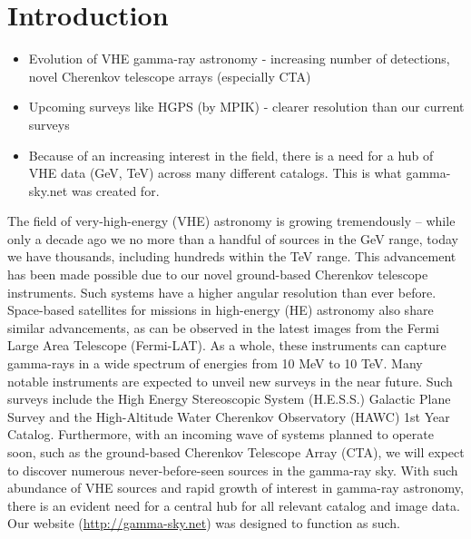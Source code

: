 \section{Introduction}

\begin{itemize}

\item Evolution of VHE gamma-ray astronomy - increasing number of detections, novel Cherenkov telescope arrays (especially CTA)

\item Upcoming surveys like HGPS (by MPIK) - clearer resolution than our current surveys

\item Because of an increasing interest in the field, there is a need for a hub of VHE data (GeV, TeV) across many different catalogs.
This is what gamma-sky.net was created for.

\end{itemize}


    The field of very-high-energy (VHE) astronomy is growing tremendously – while only
    a decade ago we no more than a handful of sources in the GeV range, today we have thousands, including
    hundreds within the TeV range. This advancement has been made possible due to our novel ground-based Cherenkov telescope instruments. Such systems have a higher angular resolution than ever before. Space-based satellites for missions in high-energy (HE) astronomy also share similar advancements, as can be observed in the latest images from the Fermi Large Area Telescope (Fermi-LAT). As a whole, these instruments can capture gamma-rays in a wide spectrum of energies from 10 MeV to 10 TeV. Many notable instruments are expected to unveil new surveys in the near future. Such surveys include the
    High Energy Stereoscopic System (H.E.S.S.) Galactic Plane Survey and the High-Altitude Water Cherenkov Observatory (HAWC) 1st Year Catalog.
    Furthermore, with an incoming wave of systems planned to operate soon, such as the ground-based Cherenkov Telescope Array (CTA),
    we will expect to discover numerous never-before-seen sources in the gamma-ray sky. With such abundance of VHE sources and
    rapid growth of interest in gamma-ray astronomy, there is an evident need for a central hub for all relevant catalog and image data.
    Our website (\url{http://gamma-sky.net}) was designed to function as such.
